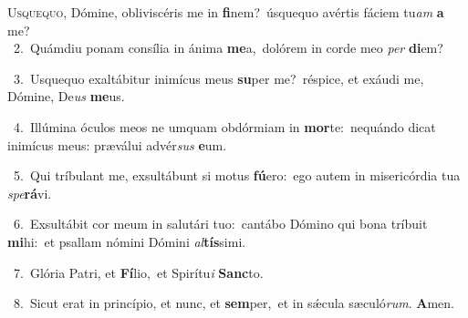\lettrine{\initial\textcolor{\initialcolor}{U}}{squequo,} Dómine, obliviscéris me in \textbf{fi}\-nem?~\star úsquequo avértis fáciem tu\textit{am} \textbf{a} me?\\
{\numbfont\textcolor{\numbcolor}{~2.}}~Quámdiu ponam consília in ánima \textbf{me}\-a,~\star dolórem in corde meo \textit{per} \textbf{di}\-em?\par
{\numbfont\textcolor{\numbcolor}{~3.}}~Usquequo exaltábitur inimícus meus \textbf{su}\-per me?~\star réspice, et exáudi me, Dómine, De\textit{us} \textbf{me}\-us.\par
{\numbfont\textcolor{\numbcolor}{~4.}}~Illúmina óculos meos ne umquam obdórmiam in \textbf{mor}\-te:~\star nequándo dicat inimícus meus: præválui advér\textit{sus} \textbf{e}\-um.\par
{\numbfont\textcolor{\numbcolor}{~5.}}~Qui tríbulant me, exsultábunt si motus \textbf{fú}\-ero:~\star ego autem in misericórdia tua \textit{spe}\-\textbf{rá}vi.\par
{\numbfont\textcolor{\numbcolor}{~6.}}~Exsultábit cor meum in salutári tuo:~\dagger cantábo Dómino qui bona tríbuit \textbf{mi}\-hi:~\star et psallam nómini Dómini \textit{al}\-\textbf{tís}simi.\par
{\numbfont\textcolor{\numbcolor}{~7.}}~Glória Patri, et \textbf{Fí}\-lio,~\star et Spirítu\textit{i} \textbf{Sanc}\-to.\par
{\numbfont\textcolor{\numbcolor}{~8.}}~Sicut erat in princípio, et nunc, et \textbf{sem}\-per,~\star et in sǽcula sæculó\-\textit{rum}\-. \textbf{A}\-men.\par
